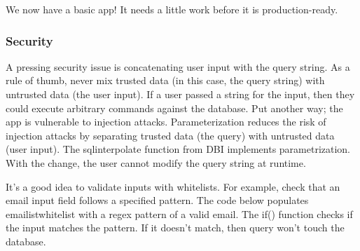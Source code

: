 \documentclass[]{article}
\newenvironment{Shaded}{\begin{snugshade}}{\end{snugshade}}
\newcommand{\CommentTok}[1]{\textcolor[rgb]{0.56,0.35,0.01}{\textit{#1}}}
\newcommand{\ControlFlowTok}[1]{\textcolor[rgb]{0.13,0.29,0.53}{\textbf{#1}}}
\newcommand{\DataTypeTok}[1]{\textcolor[rgb]{0.13,0.29,0.53}{#1}}
\newcommand{\KeywordTok}[1]{\textcolor[rgb]{0.13,0.29,0.53}{\textbf{#1}}}
\newcommand{\NormalTok}[1]{#1}
\newcommand{\OperatorTok}[1]{\textcolor[rgb]{0.81,0.36,0.00}{\textbf{#1}}}
\newcommand{\StringTok}[1]{\textcolor[rgb]{0.31,0.60,0.02}{#1}}
\begin{document}
We now have a basic app! It needs a little work before it is
production-ready.

\hypertarget{security}{%
\subsubsection{Security}\label{security}}

A pressing security issue is concatenating user input with the query
string. As a rule of thumb, never mix trusted data (in this case, the
query string) with untrusted data (the user input). If a user passed a
string for the input, then they could execute arbitrary commands against
the database. Put another way; the app is vulnerable to injection
attacks. Parameterization reduces the risk of injection attacks by
separating trusted data (the query) with untrusted data (user input).
The sqlinterpolate function from DBI implements parametrization. With
the change, the user cannot modify the query string at runtime.

\begin{Shaded}
\end{Shaded}

It's a good idea to validate inputs with whitelists. For example, check
that an email input field follows a specified pattern. The code below
populates emailistwhitelist with a regex pattern of a valid email. The
if() function checks if the input matches the pattern. If it doesn't
match, then query won't touch the database.

\begin{Shaded}
\end{Shaded}
\end{document}

